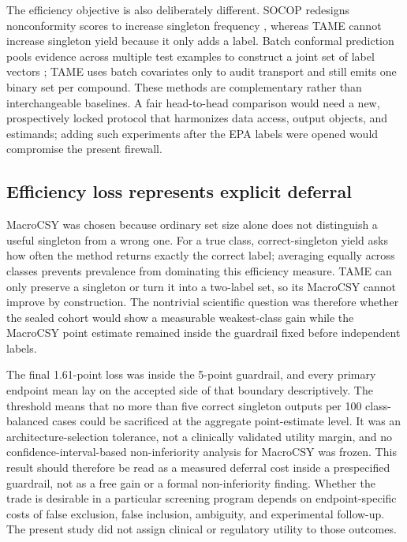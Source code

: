 The efficiency objective is also deliberately different. SOCOP redesigns nonconformity scores to increase singleton frequency \citep{wang2025socop}, whereas TAME cannot increase singleton yield because it only adds a label. Batch conformal prediction pools evidence across multiple test examples to construct a joint set of label vectors \citep{gazin2025batch}; TAME uses batch covariates only to audit transport and still emits one binary set per compound. These methods are complementary rather than interchangeable baselines. A fair head-to-head comparison would need a new, prospectively locked protocol that harmonizes data access, output objects, and estimands; adding such experiments after the EPA labels were opened would compromise the present firewall.

\subsection{Efficiency loss represents explicit deferral}

MacroCSY was chosen because ordinary set size alone does not distinguish a useful singleton from a wrong one. For a true class, correct-singleton yield asks how often the method returns exactly the correct label; averaging equally across classes prevents prevalence from dominating this efficiency measure. TAME can only preserve a singleton or turn it into a two-label set, so its MacroCSY cannot improve by construction. The nontrivial scientific question was therefore whether the sealed cohort would show a measurable weakest-class gain while the MacroCSY point estimate remained inside the guardrail fixed before independent labels.

The final 1.61-point loss was inside the 5-point guardrail, and every primary endpoint mean lay on the accepted side of that boundary descriptively. The threshold means that no more than five correct singleton outputs per 100 class-balanced cases could be sacrificed at the aggregate point-estimate level. It was an architecture-selection tolerance, not a clinically validated utility margin, and no confidence-interval-based non-inferiority analysis for MacroCSY was frozen. This result should therefore be read as a measured deferral cost inside a prespecified guardrail, not as a free gain or a formal non-inferiority finding. Whether the trade is desirable in a particular screening program depends on endpoint-specific costs of false exclusion, false inclusion, ambiguity, and experimental follow-up. The present study did not assign clinical or regulatory utility to those outcomes.

